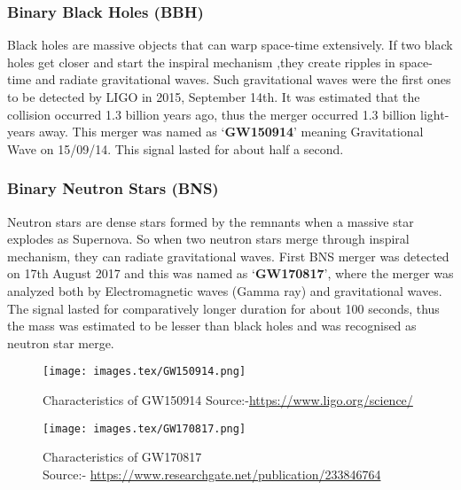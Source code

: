 \pagebreak

\subsubsection{Binary Black Holes (BBH)}

Black holes are massive objects that can warp space-time extensively. If two black holes get closer and start the inspiral mechanism ,they create ripples in space-time and radiate gravitational waves. Such gravitational waves were the first ones to be detected by LIGO in 2015, September 14th. It was estimated that the collision occurred 1.3 billion years ago, thus the merger occurred 1.3 billion light-years away. This merger was named as `\textbf{GW150914}' meaning Gravitational Wave on 15/09/14. This signal lasted for about half a second.

\subsubsection{Binary Neutron Stars (BNS)}

Neutron stars are dense stars formed by the remnants when a massive star explodes as Supernova. So when two neutron stars merge through inspiral mechanism, they can radiate gravitational waves. First BNS merger was detected on 17th August 2017 and this was named as `\textbf{GW170817}', where the merger was analyzed both by Electromagnetic waves (Gamma ray) and gravitational waves. The signal lasted for comparatively longer duration for about 100 seconds, thus the mass was estimated to be lesser than black holes and was recognised as neutron star merge.



\begin{figure}[h]
    \centering
    \texttt{[image: images.tex/GW150914.png]}
    \caption{Characteristics of GW150914   Source:-\url{https://www.ligo.org/science/}}
\end{figure}

\begin{figure}[h]
     \centering
     \texttt{[image: images.tex/GW170817.png]}
     \caption{Characteristics of GW170817\\ Source:- \url{https://www.researchgate.net/publication/233846764}}
\end{figure}

\pagebreak
